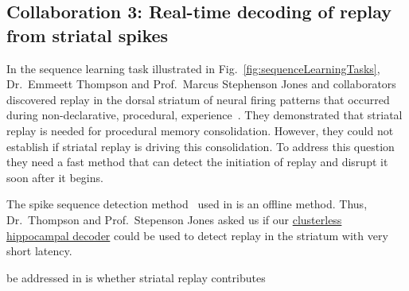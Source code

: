 \subsection{Collaboration 3: Real-time decoding of replay from striatal spikes}

In the sequence learning task illustrated in
Fig.~\ref{fig:sequenceLearningTasks}, Dr.~Emmeett Thompson and Prof.~Marcus
Stephenson Jones and collaborators discovered replay in the dorsal striatum of
neural firing patterns that occurred during non-declarative, procedural,
experience~\citep{thomsonEtAl24}.
%
They demonstrated that striatal replay is needed for procedural memory
consolidation.
%
However, they could not establish if striatal replay is driving this
consolidation.
%
To address this question they need a fast method that can detect the initiation
of replay and disrupt it soon after it begins.

The spike sequence detection method~\citep{williamsEtAl20} used in
\citet{thompsonEtAl24} is an offline method. Thus, Dr.~Thompson and
Prof.~Stepenson Jones asked us if our
\href{https://bonsai-rx.org/machinelearning/examples/examples/PointProcessDecoder/DecodePositionFromHippocampusClusterless/README.html}{clusterless
hippocampal decoder} could be used to detect replay in the striatum with very
short latency.



be addressed in \citet{thompsonEtAl24} is
whether striatal replay contributes
